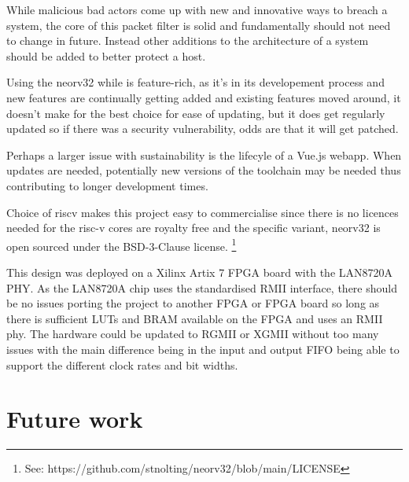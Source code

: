 While malicious bad actors come up with new and innovative ways to breach a system, the core of this packet filter is solid and fundamentally should not need to change in future. Instead other additions to the architecture of a system should be added to better protect a host. 

Using the neorv32 while is feature-rich, as it's in its developement process and new features are continually getting added and existing features moved around, it doesn't make for the best choice for ease of updating, but it does get regularly updated so if there was a security vulnerability, odds are that it will get patched.

Perhaps a larger issue with sustainability is the lifecyle of a Vue.js webapp. When updates are needed, potentially new versions of the toolchain may be needed thus contributing to longer development times. 

Choice of riscv makes this project easy to commercialise since there is no licences needed for the risc-v cores are royalty free and the specific variant, neorv32 is open sourced under the BSD-3-Clause license. \footnote[1]{See: https://github.com/stnolting/neorv32/blob/main/LICENSE}

This design was deployed on a Xilinx Artix 7 FPGA board with the LAN8720A PHY. As the LAN8720A chip uses the standardised RMII interface, there should be no issues porting the project to another FPGA or FPGA board so long as there is sufficient LUTs and BRAM available on the FPGA and uses an RMII phy. The hardware could be updated to RGMII or XGMII without too many issues with the main difference being in the input and output FIFO being able to support the different clock rates and bit widths.  


\section{Future work}


